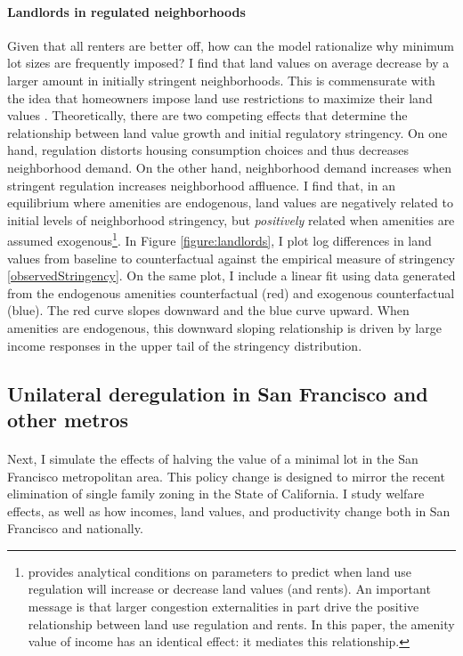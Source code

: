 \documentclass[12pt]{article}
\begin{document}
\paragraph*{Landlords in regulated neighborhoods}
Given that all renters are better off, how can the model rationalize why minimum lot sizes are frequently imposed? I find that land values on average decrease by a larger amount in initially stringent neighborhoods. This is commensurate with the idea that homeowners impose land use restrictions to maximize their land values \citep{parkho, HILBER2013, homevoterhypothesis}. Theoretically, there are two competing effects that determine the relationship between land value growth and initial regulatory stringency. On one hand, regulation distorts housing consumption choices and thus decreases neighborhood demand. On the other hand, neighborhood demand increases when stringent regulation increases neighborhood affluence. I find that, in an equilibrium where amenities are endogenous, land values are negatively related to initial levels of neighborhood stringency, but \textit{positively} related when amenities are assumed exogenous\footnote{\cite{parkho} provides analytical conditions on parameters to predict when land use regulation will increase or decrease land values (and rents). An important message is that larger congestion externalities in part drive the positive relationship between land use regulation and rents. In this paper, the amenity value of income has an identical effect: it mediates this relationship.}. In Figure \ref{figure:landlords}, I plot log differences in land values from baseline to counterfactual against the empirical measure of stringency \eqref{observedStringency}. On the same plot, I include a linear fit using data generated from the endogenous amenities counterfactual (red) and exogenous counterfactual (blue). The red curve slopes downward and the blue curve upward. When amenities are endogenous, this downward sloping relationship is driven by large income responses in the upper tail of the stringency distribution. 


\subsection{Unilateral deregulation in San Francisco and other metros}\label{Ctfl:HalveMinimumInMetros}
\paragraph*{}
 Next, I simulate the effects of halving the value of a minimal lot in the San Francisco metropolitan area. This policy change is designed to mirror the recent elimination of single family zoning in the State of California. I study welfare effects, as well as how incomes, land values, and productivity change both in San Francisco and nationally.
\end{document}

